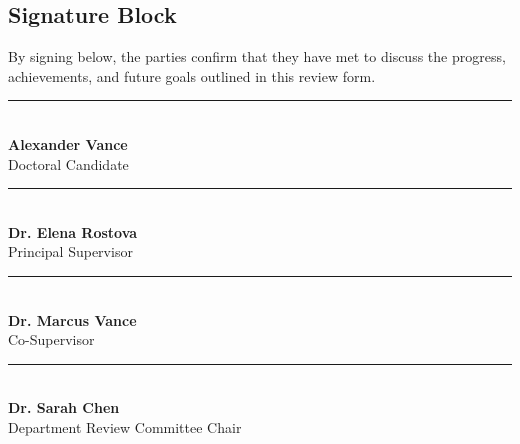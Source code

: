 \subsection{Signature Block}
By signing below, the parties confirm that they have met to discuss the progress, achievements, and future goals outlined in this review form.

\vspace{1.0cm}
\noindent
\begin{minipage}[t]{0.45\textwidth}
  \rule{\textwidth}{0.5pt}\\
  \textbf{Alexander Vance}\\
  Doctoral Candidate
\end{minipage}
\hfill
\begin{minipage}[t]{0.45\textwidth}
  \rule{\textwidth}{0.5pt}\\
  \textbf{Dr. Elena Rostova}\\
  Principal Supervisor
\end{minipage}

\vspace{1.5cm}
\noindent
\begin{minipage}[t]{0.45\textwidth}
  \rule{\textwidth}{0.5pt}\\
  \textbf{Dr. Marcus Vance}\\
  Co-Supervisor
\end{minipage}
\hfill
\begin{minipage}[t]{0.45\textwidth}
  \rule{\textwidth}{0.5pt}\\
  \textbf{Dr. Sarah Chen}\\
  Department Review Committee Chair
\end{minipage}
